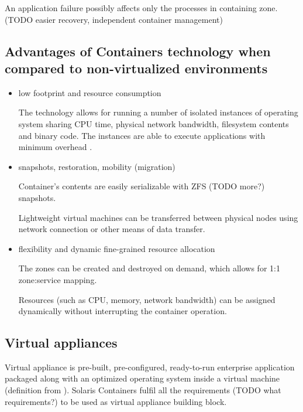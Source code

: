 \documentclass[11pt]{book}
\begin{document}
        An application failure possibly affects only the processes in containing zone. (TODO easier recovery,
        independent container management)
      

      \subsection{Advantages of Containers technology when compared to non-virtualized environments}
      \label{sub:}
              
        \begin{itemize}
          \item low footprint and resource consumption

            The technology allows for running a number of isolated instances of operating system sharing CPU time,
            physical network bandwidth, filesystem contents and binary code. The instances are able to execute applications with minimum overhead \cite{price}.

          \item snapshots, restoration, mobility (migration)

            Container's contents are easily serializable with ZFS (TODO more?) snapshots.

            Lightweight virtual machines can be transferred between physical nodes using network connection or other
            means of data transfer.

          \item flexibility and dynamic fine-grained resource allocation

            The zones can be created and destroyed on demand, which allows for 1:1 zone:service mapping.

            Resources (such as CPU, memory, network bandwidth) can be assigned dynamically without interrupting the
            container operation.

        \end{itemize}


      \subsection{Virtual appliances}
      \label{sub:}

        Virtual appliance is pre-built, pre-configured, ready-to-run enterprise application packaged along with an
        optimized operating system inside a virtual machine (definition from \cite{changhua}). Solaris Containers
        fulfil all the requirements (TODO what requirements?) to be used as virtual appliance building block.
\end{document}
